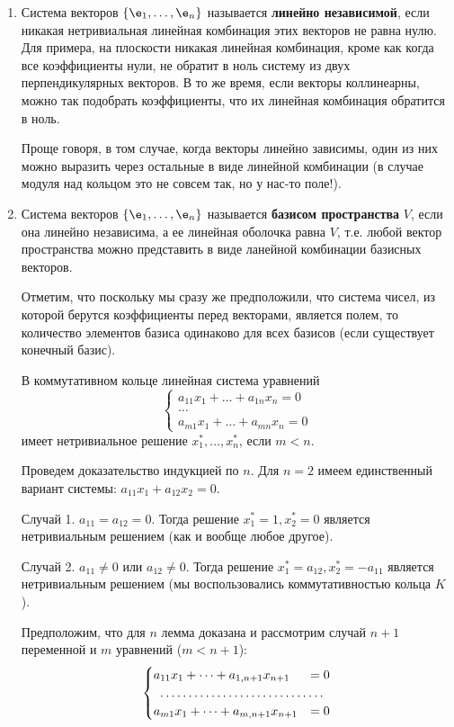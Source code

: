 \begin{enumerate}
\item Система векторов $\{\e_1,\dots,\e_n\}$ называется \textbf{линейно независимой}, если никакая нетривиальная линейная комбинация этих векторов не равна нулю. Для примера, на плоскости никакая линейная комбинация, кроме как когда все коэффициенты нули, не обратит в ноль систему из двух перпендикулярных векторов. В то же время, если векторы коллинеарны, можно так подобрать коэффициенты, что их линейная комбинация обратится в ноль. 

Проще говоря, в том случае, когда векторы линейно зависимы, один из них можно выразить через остальные в виде линейной комбинации (в случае модуля над кольцом это не совсем так, но у нас-то поле!).

\item Система векторов $\{\e_1,\dots,\e_n\}$ называется \textbf{базисом пространства} $V$, если она линейно независима, а ее линейная оболочка равна $V$, т.е. любой вектор пространства можно представить в виде ланейной комбинации базисных векторов.

Отметим, что поскольку мы сразу же предположили, что система чисел, из которой берутся коэффициенты перед векторами, является полем, то количество элементов базиса одинаково для всех базисов (если существует конечный базис).

\begin{lem} В коммутативном кольце линейная система уравнений
$$
\begin{cases}
a_{11}x_1+\dots+a_{1n}x_n=0 \\
\dots \\
a_{m1}x_1+\dots+a_{mn}x_n=0
\end{cases}
$$
имеет нетривиальное решение $x_1^*,\dots,x_n^*$, если $m<n$.
\end{lem}
\pf Проведем доказательство индукцией по $n$. Для $n=2$ имеем единственный вариант системы: $a_{11}x_1+a_{12}x_2=0$.

Случай 1. $a_{11}=a_{12}=0$. Тогда решение $x_1^*=1, x_2^*=0$ является нетривиальным решением (как и вообще любое другое).

Случай 2. $a_{11}\ne 0$ или $a_{12}\ne 0$. Тогда решение $x_1^*=a_{12}, x_2^*=-a_{11}$ является нетривиальным решением (мы воспользовались коммутативностью кольца $K$).

Предположим, что для $n$ лемма доказана и рассмотрим случай $n+1$ переменной и $m$ уравнений ($m<n+1$):
\begin{equation}\label{systema2}
\begin{cases}
a_{11}x_1+\dots+a_{1,n+1}x_{n+1} &= 0 \\
\hdotsfor{2} \\
a_{m1}x_1+\dots+a_{m,n+1}x_{n+1} &= 0
\end{cases}
\end{equation}


\end{enumerate}
